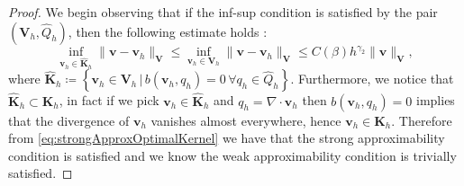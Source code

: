 \documentclass[USenglish]{article}
\theoremstyle{dgthm}
\theoremstyle{dgdef}
\let\vec\bm
\newcommand\norm[1]{\lVert#1\rVert}
\begin{document}
\begin{proof}
  We begin observing that if the inf-sup condition is satisfied by the pair $(\vec{V}_h,\hat{Q}_h)$, then the following estimate holds \cite[Proposition 5.1.3]{BBF}:
  \begin{equation}
    \underset{\vec{v}_h\in \hat{\vec{K}}_h}{\inf}\norm{\vec{v}-\vec{v}_h}_{\vec{V}}\leq \underset{\vec{v}_h\in \vec{V}_h}{\inf}\norm{\vec{v}-\vec{v}_h}_{\vec{V}}\leq C(\beta)h^{\gamma_2}\norm{\vec{v}}_{\vec{V}},\label{eq:strongApproxOptimalKernel}
  \end{equation}
  where $\hat{\vec{K}}_h\coloneqq \left\{\vec{v}_h\in \vec{V}_h\,|\, b(\vec{v}_h,q_h)=0\, \forall q_h\in \hat{Q}_h\right\}$.
  Furthermore, we notice that $\hat{\vec{K}}_h\subset \vec{K}_h$, in fact if we pick $\vec{v}_h\in \hat{\vec{K}}_h$ and $q_h = \nabla\cdot \vec{v}_h$ then $b(\vec{v}_h,q_h)=0$ implies that the divergence of $\vec{v}_h$ vanishes almost everywhere, hence $\vec{v}_h\in \vec{K}_h$.
  Therefore from \eqref{eq:strongApproxOptimalKernel} we have that the strong approximability condition is satisfied and we know the weak approximability condition is trivially satisfied.
\end{proof}
\end{document}
